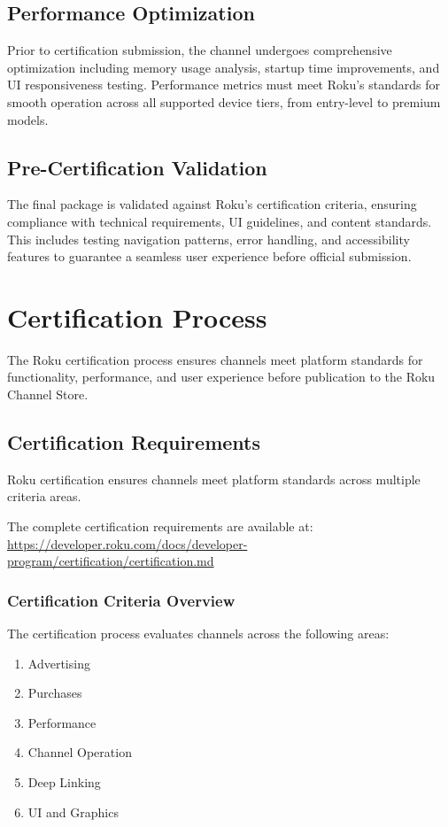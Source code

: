 \documentclass[11pt,letterpaper]{article}
\begin{document}
\subsection{Performance Optimization}
Prior to certification submission, the channel undergoes comprehensive optimization including memory usage analysis, startup time improvements, and UI responsiveness testing. Performance metrics must meet Roku's standards for smooth operation across all supported device tiers, from entry-level to premium models.

\subsection{Pre-Certification Validation}
The final package is validated against Roku's certification criteria, ensuring compliance with technical requirements, UI guidelines, and content standards. This includes testing navigation patterns, error handling, and accessibility features to guarantee a seamless user experience before official submission.

\section{Certification Process}
\label{sec:certification}

The Roku certification process ensures channels meet platform standards for functionality, performance, and user experience before publication to the Roku Channel Store.

\subsection{Certification Requirements}

Roku certification ensures channels meet platform standards across multiple criteria areas.

The complete certification requirements are available at:
\url{https://developer.roku.com/docs/developer-program/certification/certification.md}

\subsubsection{Certification Criteria Overview}
The certification process evaluates channels across the following areas:
\begin{enumerate}
    \item Advertising
    \item Purchases
    \item Performance
    \item Channel Operation
    \item Deep Linking
    \item UI and Graphics
\end{enumerate}
\end{document}
